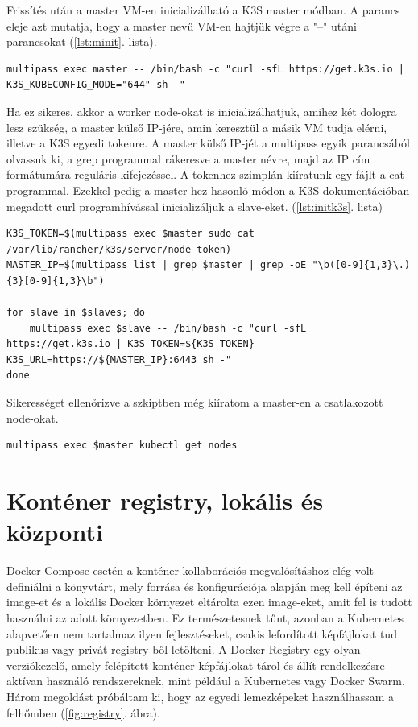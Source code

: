 \noindent
Frissítés után a master VM-en inicializálható a K3S master módban. A parancs eleje azt mutatja, hogy a master nevű VM-en hajtjük végre a "--" utáni parancsokat (\ref{lst:minit}. lista).
\begin{minipage}{\linewidth}
\begin{lstlisting}[caption={K3S Master inicializálása},label={lst:minit}]
multipass exec master -- /bin/bash -c "curl -sfL https://get.k3s.io | K3S_KUBECONFIG_MODE="644" sh -"
\end{lstlisting}
\end{minipage}
\noindent
Ha ez sikeres, akkor a worker node-okat is inicializálhatjuk, amihez két dologra lesz szükség, a master külső IP-jére, amin keresztül a másik VM tudja elérni, illetve a K3S egyedi tokenre. A master külső IP-jét a multipass egyik parancsából olvassuk ki, a grep programmal rákeresve a master névre, majd az IP cím formátumára reguláris kifejezéssel. A tokenhez szimplán kiíratunk egy fájlt a cat programmal. Ezekkel pedig a master-hez hasonló módon a K3S dokumentációban megadott curl programhívással inicializáljuk a slave-eket. (\ref{lst:initk3s}. lista)
\begin{minipage}{\linewidth}
\begin{lstlisting}[caption={K3S Slave-ek inicializálása},label={lst:initk3s}]
K3S_TOKEN=$(multipass exec $master sudo cat /var/lib/rancher/k3s/server/node-token)
MASTER_IP=$(multipass list | grep $master | grep -oE "\b([0-9]{1,3}\.){3}[0-9]{1,3}\b")

for slave in $slaves; do
	multipass exec $slave -- /bin/bash -c "curl -sfL https://get.k3s.io | K3S_TOKEN=${K3S_TOKEN} K3S_URL=https://${MASTER_IP}:6443 sh -"
done
\end{lstlisting}
\end{minipage}

\noindent
Sikerességet ellenőrizve a szkiptben még kiíratom a master-en a csatlakozott node-okat.
\begin{lstlisting}[caption={Node-ok lekérdezése}]
multipass exec $master kubectl get nodes
\end{lstlisting}

\section{Konténer registry, lokális és központi}
Docker-Compose esetén a konténer kollaborációs megvalósításhoz elég volt definiálni a könyvtárt, mely forrása és konfigurációja alapján meg kell építeni az image-et és a lokális Docker környezet eltárolta ezen image-eket, amit fel is tudott használni az adott környezetben. Ez természetesnek tűnt, azonban a Kubernetes alapvetően nem tartalmaz ilyen fejlesztéseket, csakis lefordított képfájlokat tud publikus vagy privát registry-ből letölteni. A Docker Registry egy olyan verziókezelő, amely felépített konténer képfájlokat tárol és állít rendelkezésre aktívan használó rendszereknek, mint például a Kubernetes vagy Docker Swarm. Három megoldást próbáltam ki, hogy az egyedi lemezképeket használhassam a felhőmben (\ref{fig:registry}. ábra).\\

